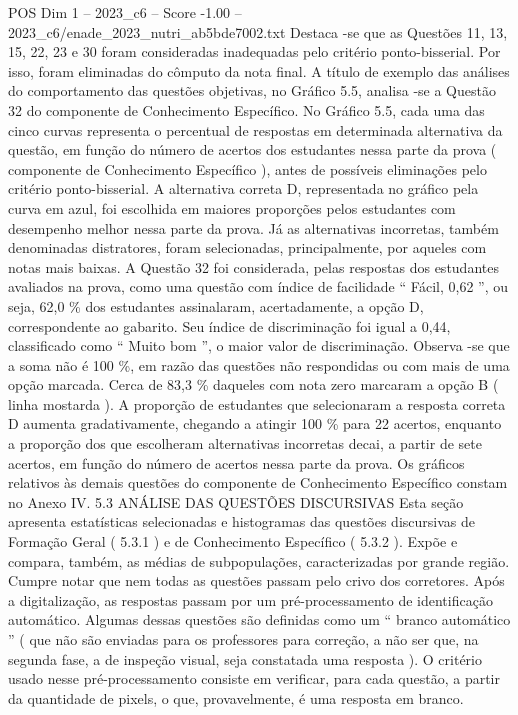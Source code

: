 \begin{textsample}{POS Dim 1 – 2023\_c6 – Score -1.00 – 2023\_c6/enade\_2023\_nutri\_ab5bde7002.txt}
Destaca -se que as Questões 11, 13, 15, 22, 23 e 30 foram consideradas inadequadas pelo critério ponto-bisserial.
Por isso, foram eliminadas do cômputo da nota final.
A título de exemplo das análises do comportamento das questões objetivas, no Gráfico 5.5, analisa -se a Questão 32 do componente de Conhecimento Específico.
No Gráfico 5.5, cada uma das cinco curvas representa o percentual de respostas em determinada alternativa da questão, em função do número de acertos dos estudantes nessa parte da prova ( componente de Conhecimento Específico ), antes de possíveis eliminações pelo critério ponto-bisserial.
A alternativa correta D, representada no gráfico pela curva em azul, foi escolhida em maiores proporções pelos estudantes com desempenho melhor nessa parte da prova.
Já as alternativas incorretas, também denominadas distratores, foram selecionadas, principalmente, por aqueles com notas mais baixas.
A Questão 32 foi considerada, pelas respostas dos estudantes avaliados na prova, como uma questão com índice de facilidade “ Fácil, 0,62 ”, ou seja, 62,0 \% dos estudantes assinalaram, acertadamente, a opção D, correspondente ao gabarito.
Seu índice de discriminação foi igual a 0,44, classificado como “ Muito bom ”, o maior valor de discriminação.
Observa -se que a soma não é 100 \%, em razão das questões não respondidas ou com mais de uma opção marcada.
Cerca de 83,3 \% daqueles com nota zero marcaram a opção B ( linha mostarda ).
A proporção de estudantes que selecionaram a resposta correta D aumenta gradativamente, chegando a atingir 100 \% para 22 acertos, enquanto a proporção dos que escolheram alternativas incorretas decai, a partir de sete acertos, em função do número de acertos nessa parte da prova.
Os gráficos relativos às demais questões do componente de Conhecimento Específico constam no Anexo IV. 5.3 ANÁLISE DAS QUESTÕES DISCURSIVAS Esta seção apresenta estatísticas selecionadas e histogramas das questões discursivas de Formação Geral ( 5.3.1 ) e de Conhecimento Específico ( 5.3.2 ).
Expõe e compara, também, as médias de subpopulações, caracterizadas por grande região.
Cumpre notar que nem todas as questões passam pelo crivo dos corretores.
Após a digitalização, as respostas passam por um pré-processamento de identificação automático.
Algumas dessas questões são definidas como um “ branco automático ” ( que não são enviadas para os professores para correção, a não ser que, na segunda fase, a de inspeção visual, seja constatada uma resposta ).
O critério usado nesse pré-processamento consiste em verificar, para cada questão, a partir da quantidade de pixels, o que, provavelmente, é uma resposta em branco.

\end{textsample}
